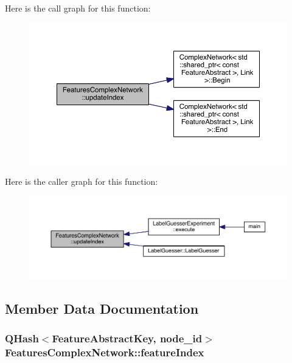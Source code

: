 Here is the call graph for this function\+:\nopagebreak
\begin{figure}[H]
\begin{center}
\leavevmode
\includegraphics[width=350pt]{class_features_complex_network_a8e1b87e9664a72c2062aae67bad94261_cgraph}
\end{center}
\end{figure}




Here is the caller graph for this function\+:
\nopagebreak
\begin{figure}[H]
\begin{center}
\leavevmode
\includegraphics[width=350pt]{class_features_complex_network_a8e1b87e9664a72c2062aae67bad94261_icgraph}
\end{center}
\end{figure}




\subsection{Member Data Documentation}
\hypertarget{class_features_complex_network_a0ae97c0bad2fcba543df55522c46242e}{
\subsubsection[{feature\+Index}]{\setlength{\rightskip}{0pt plus 5cm}Q\+Hash$<${\bf Feature\+Abstract\+Key}, {\bf node\+\_\+id}$>$ Features\+Complex\+Network\+::feature\+Index\hspace{0.3cm}{\ttfamily [private]}}}\label{class_features_complex_network_a0ae97c0bad2fcba543df55522c46242e}


